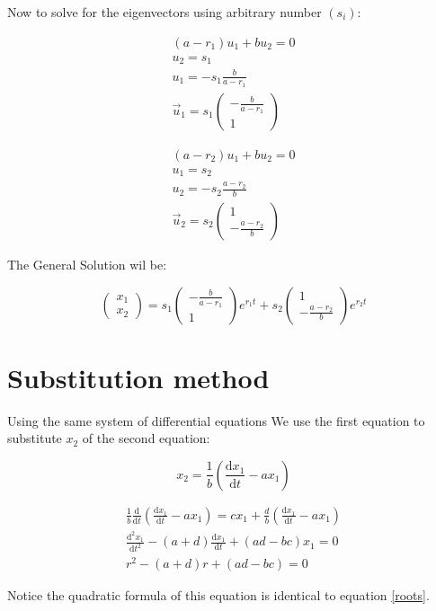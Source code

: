 \documentclass[12pt,letterpaper]{article}
\newcommand{\vectors}[2]{
	\begin{pmatrix}
		#1 \\ #2
	\end{pmatrix}
}
\begin{document}
			Now to solve for the eigenvectors using arbitrary number $(s_i)$:

			\begin{align*}
				(a-r_1) u_1 + b u_2 = 0 \\
				u_2 = s_1 \\
				u_1  = -s_1 \frac{b}{a-r_1} \\
				\vec{u}_1 = s_1 \vectors{-\frac{b}{a-r_1}}{1}
			\end{align*}

			\begin{align*}
				(a-r_2) u_1 + b u_2 = 0 \\
				u_1 = s_2 \\
				u_2  = -s_2 \frac{a-r_2}{b} \\
				\vec{u}_2 = s_2 \vectors{1}{-\frac{a-r_2}{b}}
			\end{align*}

			The General Solution wil be:

			\begin{equation}
				\vectors{x_1}{x_2} = s_1 \vectors{-\frac{b}{a-r_1}}{1} e^{r_1 t} + s_2 \vectors{1}{-\frac{a-r_2}{b}} e^{r_2 t}
			\end{equation}

	\section{Substitution method}

		Using the same system of differential equations We use the first equation to substitute $x_2$ of the second equation:

		\begin{equation}
			x_2 = \frac{1}{b} \left( \frac{\mathrm{d}x_1}{\mathrm{d}t} - ax_1 \right)	
		\end{equation}
		\label{eq:x2}

		\begin{align*}
			\frac{1}{b} \frac{\mathrm{d}}{\mathrm{d}t} \left( \frac{\mathrm{d}x_1}{\mathrm{d}t} - ax_1 \right) = cx_1 + \frac{d}{b} \left( \frac{\mathrm{d}x_1}{\mathrm{d}t} - ax_1 \right) \\
			\frac{\mathrm{d}^2 x_1}{\mathrm{d}t^2} - (a+d) \frac{\mathrm{d}x_1}{\mathrm{d}t} + (ad-bc)x_1 = 0 \\
			r^2 -(a+d) r + (ad-bc) =0
		\end{align*}

		Notice the quadratic formula of this equation is identical to equation \ref{roots}.  
\end{document}
